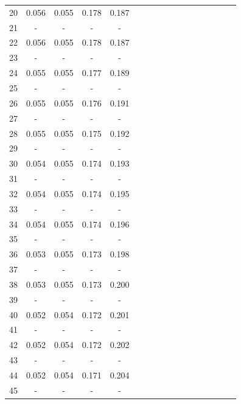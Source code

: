 \documentclass{report}
\begin{document}
\begin{appendices}
\begin{table}
\begin{tabular}{|c|cccc|cccc|cccc|cccc|}
20 & 0.056 & 0.055 & 0.178 & 0.187 & & & & & & & & & & & &\\
21 &   -   &   -   &   -   &   -   & & & & & & & & & & & &\\
22 & 0.056 & 0.055 & 0.178 & 0.187 & & & & & & & & & & & &\\
23 &   -   &   -   &   -   &   -   & & & & & & & & & & & &\\
24 & 0.055 & 0.055 & 0.177 & 0.189 & & & & & & & & & & & &\\
25 &   -   &   -   &   -   &   -   & & & & & & & & & & & &\\
26 & 0.055 & 0.055 & 0.176 & 0.191 & & & & & & & & & & & &\\
27 &   -   &   -   &   -   &   -   & & & & & & & & & & & &\\
28 & 0.055 & 0.055 & 0.175 & 0.192 & & & & & & & & & & & &\\
29 &   -   &   -   &   -   &   -   & & & & & & & & & & & &\\
30 & 0.054 & 0.055 & 0.174 & 0.193 & & & & & & & & & & & &\\
31 &   -   &   -   &   -   &   -   & & & & & & & & & & & &\\
32 & 0.054 & 0.055 & 0.174 & 0.195 & & & & & & & & & & & &\\
33 &   -   &   -   &   -   &   -   & & & & & & & & & & & &\\
34 & 0.054 & 0.055 & 0.174 & 0.196 & & & & & & & & & & & &\\
35 &   -   &   -   &   -   &   -   & & & & & & & & & & & &\\
36 & 0.053 & 0.055 & 0.173 & 0.198 & & & & & & & & & & & &\\
37 &   -   &   -   &   -   &   -   & & & & & & & & & & & &\\
38 & 0.053 & 0.055 & 0.173 & 0.200 & & & & & & & & & & & &\\
39 &   -   &   -   &   -   &   -   & & & & & & & & & & & &\\
40 & 0.052 & 0.054 & 0.172 & 0.201 & & & & & & & & & & & &\\
41 &   -   &   -   &   -   &   -   & & & & & & & & & & & &\\
42 & 0.052 & 0.054 & 0.172 & 0.202 & & & & & & & & & & & &\\
43 &   -   &   -   &   -   &   -   & & & & & & & & & & & &\\
44 & 0.052 & 0.054 & 0.171 & 0.204 & & & & & & & & & & & &\\
45 &   -   &   -   &   -   &   -   & & & & & & & & & & & &\\

\end{tabular}
\end{table}
\end{appendices}
\end{document}
